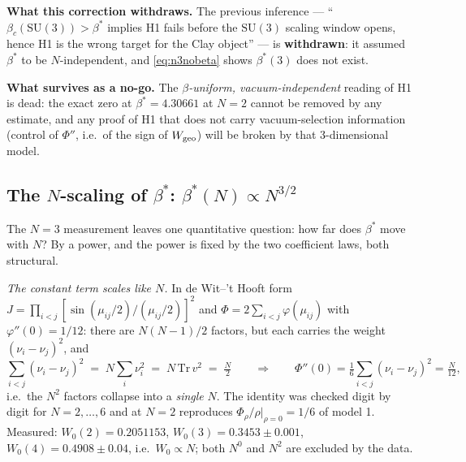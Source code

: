 \noindent
\textbf{What this correction withdraws.} The previous inference --- ``$\beta_c(\mathrm{SU}(3)) >
\beta^{*}$ implies H1 fails before the $\mathrm{SU}(3)$ scaling window opens, hence H1 is the wrong
target for the Clay object'' --- is \textbf{withdrawn}: it assumed $\beta^{*}$ to be $N$-independent,
and \eqref{eq:n3nobeta} shows $\beta^{*}(3)$ does not exist. \LE
{}

\begin{keybox}
\textbf{What survives as a no-go.} The \emph{$\beta$-uniform, vacuum-independent} reading of H1 is
dead: the exact zero at $\beta^{*}=4.30661$ at $N=2$ cannot be removed by any estimate, and any proof
of H1 that does not carry vacuum-selection information (control of $\Phi''$, i.e.\ of the sign of
$W_{\mathrm{geo}}$) will be broken by that 3-dimensional model. \LN
\end{keybox}

\subsection{The $N$-scaling of $\beta^{*}$: $\beta^{*}(N)\propto N^{3/2}$}

The $N=3$ measurement leaves one quantitative question: how far does $\beta^{*}$ move with $N$? By a
power, and the power is fixed by the two coefficient laws, both structural.

\emph{The constant term scales like $N$.} In de Wit--'t Hooft form
$J=\prod_{i<j}[\sin(\mu_{ij}/2)/(\mu_{ij}/2)]^{2}$ and $\Phi=2\sum_{i<j}\varphi(\mu_{ij})$ with
$\varphi''(0)=1/12$: there are $N(N-1)/2$ factors, but each carries the weight $(\nu_i-\nu_j)^{2}$, and
\begin{equation}
  \sum_{i<j}(\nu_i-\nu_j)^{2} \;=\; N\sum_i\nu_i^{2} \;=\; N\,\mathrm{Tr}\,v^{2} \;=\; \tfrac{N}{2}
  \qquad\Longrightarrow\qquad
  \Phi''(0)=\tfrac16\sum_{i<j}(\nu_i-\nu_j)^{2}=\tfrac{N}{12},
  \label{eq:phipp}
\end{equation}
i.e.\ the $N^{2}$ factors collapse into a \emph{single} $N$. The identity was checked digit by digit for
$N=2,\dots,6$ and at $N=2$ reproduces $\Phi_\rho/\rho|_{\rho=0}=1/6$ of model 1. \LT
Measured: $W_0(2)=0.2051153$, $W_0(3)=0.3453\pm0.001$, $W_0(4)=0.4908\pm0.04$, i.e.\ $W_0\propto N$;
both $N^{0}$ and $N^{2}$ are excluded by the data. \LE

